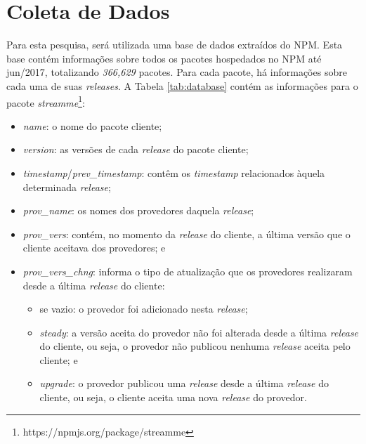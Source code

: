 \chapter{Coleta de Dados}
\label{cap:coleta-dados}

Para esta pesquisa, será utilizada uma base de dados extraídos do \gls{NPM}. Esta base contém informações sobre todos os pacotes hospedados no \gls{NPM} até jun/2017, totalizando \textit{366,629} pacotes. Para cada pacote, há informações sobre cada uma de suas \textit{releases}. A Tabela \ref{tab:database} contém as informações para o pacote \textit{streamme}\footnote{https://npmjs.org/package/streamme}:

\begin{itemize}
    \item \textit{name}: o nome do pacote cliente;
    \item \textit{version}: as versões de cada \textit{release} do pacote cliente;
    \item \textit{timestamp}/\textit{prev\_timestamp}: contêm os \textit{timestamp} relacionados àquela determinada \textit{release};
    \item \textit{prov\_name}: os nomes dos provedores daquela \textit{release};
    \item \textit{prov\_vers}: contém, no momento da \textit{release} do cliente, a última versão que o cliente aceitava dos provedores; e
    \item \textit{prov\_vers\_chng}: informa o tipo de atualização que os provedores realizaram desde a última \textit{release} do cliente:
    \begin{itemize}
        \item se vazio: o provedor foi adicionado nesta \textit{release};
        \item \textit{steady}: a versão aceita do provedor não foi alterada desde a última \textit{release} do cliente, ou seja, o provedor não publicou nenhuma \textit{release} aceita pelo cliente; e
        \item \textit{upgrade}: o provedor publicou uma \textit{release} desde a última \textit{release} do cliente, ou seja, o cliente aceita uma nova \textit{release} do provedor.
    \end{itemize}
\end{itemize}{}
  
